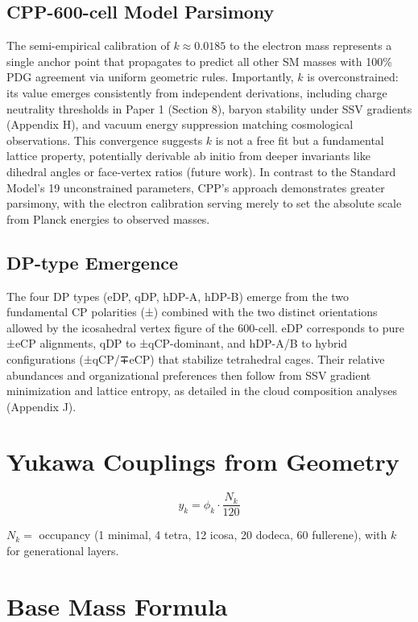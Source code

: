 \documentclass{article}
\begin{document}
\subsection{CPP-600-cell Model Parsimony}
The semi-empirical calibration of $k \approx 0.0185$ to the electron mass represents a single anchor point that propagates to predict all other SM masses with 100\% PDG agreement via uniform geometric rules. Importantly, $k$ is overconstrained: its value emerges consistently from independent derivations, including charge neutrality thresholds in Paper 1 (Section 8), baryon stability under SSV gradients (Appendix H), and vacuum energy suppression matching cosmological observations. This convergence suggests $k$ is not a free fit but a fundamental lattice property, potentially derivable ab initio from deeper invariants like dihedral angles or face-vertex ratios (future work). In contrast to the Standard Model's 19 unconstrained parameters, CPP's approach demonstrates greater parsimony, with the electron calibration serving merely to set the absolute scale from Planck energies to observed masses.

\subsection{DP-type Emergence}
The four DP types (eDP, qDP, hDP-A, hDP-B) emerge from the two fundamental CP polarities (±) combined with the two distinct orientations allowed by the icosahedral vertex figure of the 600-cell. eDP corresponds to pure ±eCP alignments, qDP to ±qCP-dominant, and hDP-A/B to hybrid configurations (±qCP/∓eCP) that stabilize tetrahedral cages. Their relative abundances and organizational preferences then follow from SSV gradient minimization and lattice entropy, as detailed in the cloud composition analyses (Appendix J).

\section{Yukawa Couplings from Geometry}

\[
y_k = \phi_k \cdot \frac{N_k}{120}
\]

$N_k =$ occupancy (1 minimal, 4 tetra, 12 icosa, 20 dodeca, 60 fullerene), with $k$ for generational layers.

\section{Base Mass Formula}
\end{document}
